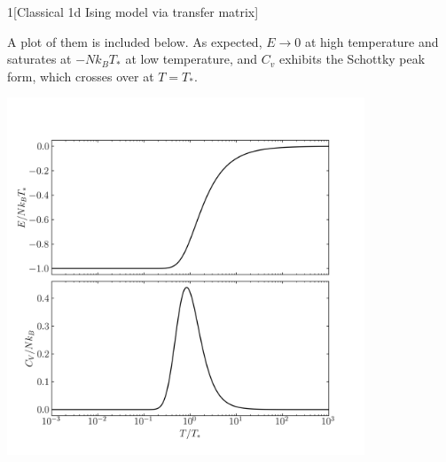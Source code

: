 \documentclass[12pt]{article}
\begin{document}
\begin{problem}{1}[Classical 1d Ising model via transfer matrix]
\begin{solution}
\begin{equation}
\end{equation}
A plot of them is included below. As expected, $E\to0$ at high temperature and
saturates at $-Nk_BT_\ast$ at low temperature, and $C_v$ exhibits the Schottky
peak form, which crosses over at $T=T_\ast$.
\begin{center}
    \includegraphics[width=0.8\textwidth]{p1.png} 
\end{center}
\end{solution}
\end{problem}
\newpage
\end{document}
